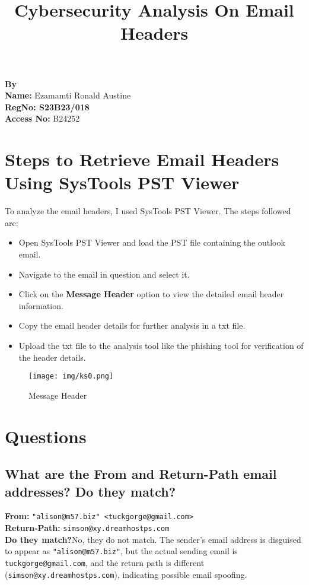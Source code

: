 \documentclass{article}
\title{\LARGE\textbf{Cybersecurity Analysis On Email Headers}}
\date{}
\begin{document}
\vspace{-5cm}
\maketitle
\vspace{-1.5cm}
\begin{center}
\large\textbf{By}\\
\vspace{0.5cm}
\large\textbf{Name:} Ezamamti Ronald Austine \\ 
\vspace{0.5cm}
\large\textbf{RegNo: S23B23/018}\\
\vspace{0.5cm}
\large\textbf{Access No:} B24252
\end{center}

\vspace{1cm}
\section*{Steps to Retrieve Email Headers Using SysTools PST Viewer}
To analyze the email headers, I used SysTools PST Viewer. The steps followed are:
\begin{itemize}
    \item Open SysTools PST Viewer and load the PST file containing the outlook email.
    \item Navigate to the email in question and select it.
    \item Click on the \textbf{Message Header} option to view the detailed email header information.
    \item Copy the email header details for further analysis in a txt file.
    \item Upload the txt file to the analysis tool like the phishing tool for verification of the header details.
\end{itemize}

\begin{figure}[h]
    \centering
    \texttt{[image: img/ks0.png]}
    \caption{Message Header}
    \label{fig:email_header}
\end{figure}

\section*{Questions}

\subsection*{What are the From and Return-Path email addresses? Do they match?}
\textbf{From:} \texttt{"alison@m57.biz" <tuckgorge@gmail.com>}\\
\textbf{Return-Path:} \texttt{simson@xy.dreamhostps.com}\\
\textbf{Do they match?}No, they do not match. The sender's email address is disguised to appear as \texttt{"alison@m57.biz"}, but the actual sending email is \texttt{tuckgorge@gmail.com}, and the return path is different \\ (\texttt{simson@xy.dreamhostps.com}), indicating possible email spoofing.
\end{document}
